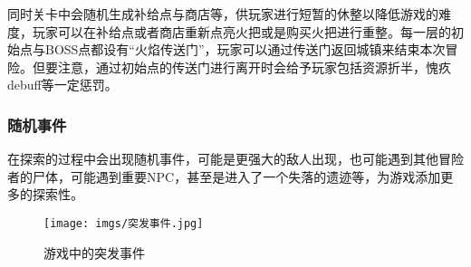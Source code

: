 同时关卡中会随机生成补给点与商店等，供玩家进行短暂的休整以降低游戏的难度，玩家可以在补给点或者商店重新点亮火把或是购买火把进行重整。每一层的初始点与BOSS点都设有“火焰传送门”，玩家可以通过传送门返回城镇来结束本次冒险。但要注意，通过初始点的传送门进行离开时会给予玩家包括资源折半，愧疚debuff等一定惩罚。


\subsubsection{随机事件}

在探索的过程中会出现随机事件，可能是更强大的敌人出现，也可能遇到其他冒险者的尸体，可能遇到重要NPC，甚至是进入了一个失落的遗迹等，为游戏添加更多的探索性。

\begin{figure}[ht]
    \centering
    \texttt{[image: imgs/突发事件.jpg]}
    \caption{游戏中的突发事件}
\end{figure}